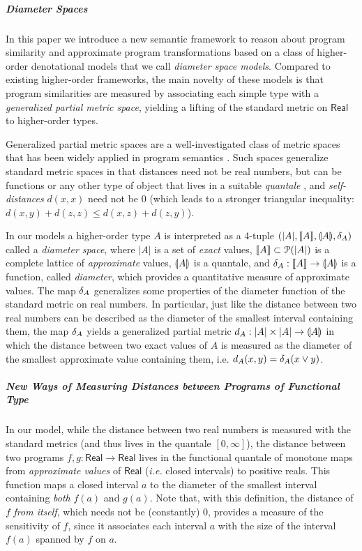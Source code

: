 \subparagraph*{Diameter Spaces}

In this paper we introduce a new semantic framework to reason about program similarity and approximate program transformations based on 
a class of higher-order denotational models that we call \emph{diameter space models}. Compared to existing higher-order frameworks, the main novelty of these models is that program similarities are measured by associating each simple type with 
 a \emph{generalized partial metric space}, yielding a lifting of the standard metric on $\mathsf{Real}$ to higher-order types.

Generalized partial metric spaces are a well-investigated class of metric spaces that has been widely applied in program semantics \cite{bkmp:partial-metrics, Bukatin1997, doi:10.1111/j.1749-6632.1994.tb44144.x, Schellekens2004, Samet:2013aa, Stubbe2018, HE201999}. 
Such spaces generalize standard metric spaces in that distances
need not be real numbers, but can be functions or any other type of object that lives in a suitable \emph{quantale} \cite{Hofmann2014}, and \emph{self-distances} $d(x,x)$ need not be $0$ (which leads to a stronger triangular inequality: $d(x,y) + d(z,z)\leq d(x,z)+d(z,y)$).


In our models a higher-order type $A$ is interpreted as a 4-tuple $(|A|, \llbracket A \rrbracket, \llparenthesis A \rrparenthesis, \delta_{A})$ called a \emph{diameter space}, where $|A|$ is a set of \emph{exact} values, $\llbracket A \rrbracket\subset \mathcal P(|A|)$ is a complete lattice of \emph{approximate} values, $\llparenthesis A \rrparenthesis$ is a {quantale}, and $\delta_{A}: \llbracket A \rrbracket\to \llparenthesis A \rrparenthesis$ is a function, called \emph{diameter}, which provides a quantitative measure of approximate values.
The map $\delta_{A}$ generalizes some properties of the diameter function of the standard metric on real numbers. In particular, just like the distance between two real numbers can be described as the diameter of the smallest interval containing them, the map $\delta_{A}$ yields a generalized partial metric  $d_{A}:|A|\times |A|\to \llparenthesis A \rrparenthesis$ in which the distance between two exact values of $A$ is measured as the diameter of the smallest approximate value containing them, i.e.  $d_{A}(x,y)=\delta_{A}(x\vee y)$. 


\subparagraph*{New Ways of Measuring Distances between Programs of Functional Type}

In our model, while the distance between two real numbers is measured with the standard metrics (and thus lives in the quantale $[0,\infty]$), the distance between  two programs $f,g:\mathsf{Real}\to \mathsf{Real}$ lives in the functional quantale of monotone maps from \emph{approximate values} of $\mathsf{Real}$ (\emph{i.e.} closed intervals) to positive reals. This function maps a closed interval $a$ to the diameter of the smallest interval containing \emph{both} $f(a)$ and $g(a)$. 
Note that, with this definition, 
 the distance of $f$ \emph{from itself}, which needs not be (constantly) 0,  provides a measure of the sensitivity of $f$, since it associates each interval $a$ with the size of the interval $f(a)$ spanned by $f$ on $a$. 
 

